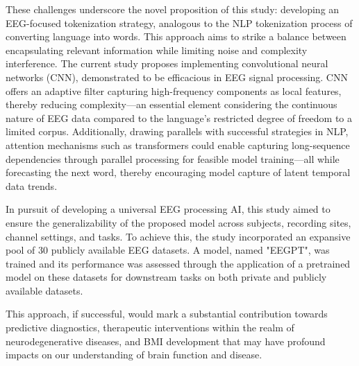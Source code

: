 These challenges underscore the novel proposition of this study: developing an EEG-focused tokenization strategy, analogous to the NLP tokenization process of converting language into words. This approach aims to strike a balance between encapsulating relevant information while limiting noise and complexity interference.
The current study proposes implementing convolutional neural networks (CNN), demonstrated to be efficacious in EEG signal processing. CNN offers an adaptive filter capturing high-frequency components as local features, thereby reducing complexity—an essential element considering the continuous nature of EEG data compared to the language’s restricted degree of freedom to a limited corpus. Additionally, drawing parallels with successful strategies in NLP, attention mechanisms such as transformers could enable capturing long-sequence dependencies through parallel processing for feasible model training—all while forecasting the next word, thereby encouraging model capture of latent temporal data trends.

In pursuit of developing a universal EEG processing AI, this study aimed to ensure the generalizability of the proposed model across subjects, recording sites, channel settings, and tasks. To achieve this, the study incorporated an expansive pool of 30 publicly available EEG datasets. A model, named "EEGPT", was trained and its performance was assessed through the application of a pretrained model on these datasets for downstream tasks on both private and publicly available datasets.

This approach, if successful, would mark a substantial contribution towards predictive diagnostics, therapeutic interventions within the realm of neurodegenerative diseases, and BMI development that may have profound impacts on our understanding of brain function and disease.

\label{sec:introduction}